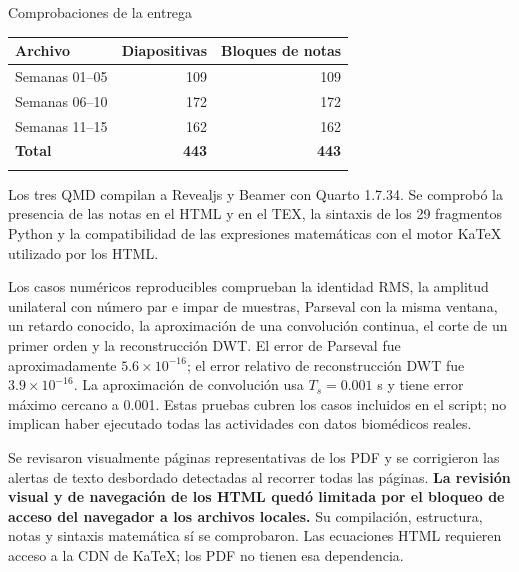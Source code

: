 \documentclass[
  10pt,
  ignorenonframetext,
  aspectratio=169,
  spanish,
]{beamer}
\begin{document}
\begin{frame}{Comprobaciones de la entrega}
\label{comprobaciones-de-la-entrega}
\begin{longtable}[]{@{}lrr@{}}
\toprule\noalign{}
Archivo & Diapositivas & Bloques de notas \\
\midrule\noalign{}
\endhead
Semanas 01--05 & 109 & 109 \\
Semanas 06--10 & 172 & 172 \\
Semanas 11--15 & 162 & 162 \\
\textbf{Total} & \textbf{443} & \textbf{443} \\
\bottomrule\noalign{}
\end{longtable}

Los tres QMD compilan a Revealjs y Beamer con Quarto 1.7.34. Se comprobó
la presencia de las notas en el HTML y en el TEX, la sintaxis de los 29
fragmentos Python y la compatibilidad de las expresiones matemáticas con
el motor KaTeX utilizado por los HTML.

Los casos numéricos reproducibles comprueban la identidad RMS, la
amplitud unilateral con número par e impar de muestras, Parseval con la
misma ventana, un retardo conocido, la aproximación de una convolución
continua, el corte de un primer orden y la reconstrucción DWT. El error
de Parseval fue aproximadamente \(5.6\times10^{-16}\); el error relativo
de reconstrucción DWT fue \(3.9\times10^{-16}\). La aproximación de
convolución usa \(T_s=0.001\) s y tiene error máximo cercano a 0.001.
Estas pruebas cubren los casos incluidos en el script; no implican haber
ejecutado todas las actividades con datos biomédicos reales.

Se revisaron visualmente páginas representativas de los PDF y se
corrigieron las alertas de texto desbordado detectadas al recorrer todas
las páginas. \textbf{La revisión visual y de navegación de los HTML
quedó limitada por el bloqueo de acceso del navegador a los archivos
locales.} Su compilación, estructura, notas y sintaxis matemática sí se
comprobaron. Las ecuaciones HTML requieren acceso a la CDN de KaTeX; los
PDF no tienen esa dependencia.
\end{frame}
\end{document}
